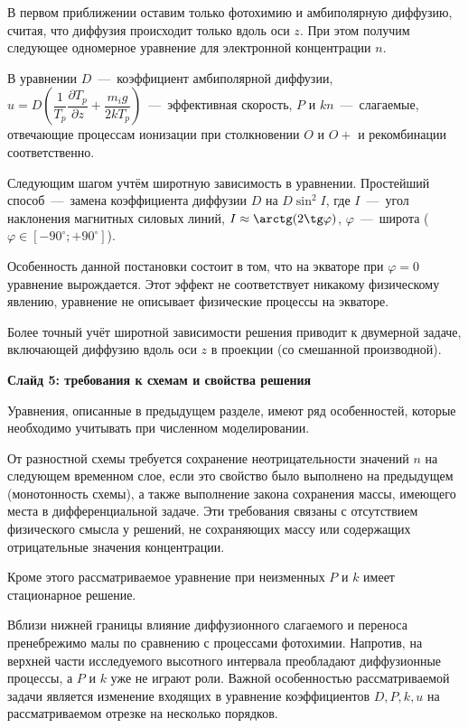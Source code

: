 \documentclass[2pt, a4paper, fleqn]{extarticle}
\begin{document}
В первом приближении оставим только фотохимию и амбиполярную диффузию, считая, что диффузия происходит только вдоль оси $z$. При этом получим следующее одномерное уравнение для электронной концентрации $n$.

В уравнении $D$~---~коэффициент амбиполярной диффузии, $u = D\left(\dfrac{1}{T_p}\dfrac{\partial T_p}{\partial z}+\dfrac{m_ig}{2kT_p}\right)$~---~эффективная скорость, $P$ и $kn$~---~слагаемые, отвечающие процессам ионизации при столкновении $O$ и $O+$ и рекомбинации соответственно.

Следующим шагом учтём широтную зависимость в уравнении. Простейший способ~---~замена коэффициента диффузии $D$ на $D\sin^2I$, где $I$~---~угол наклонения магнитных силовых линий, $I \approx \arctg(2\tg \varphi)$, $\varphi$~---~широта ($\varphi \in [-90^\circ; +90^\circ]$).

Особенность данной постановки состоит в том, что на экваторе при $\varphi=0$ уравнение вырождается. Этот эффект не соответствует никакому физическому явлению, уравнение не описывает физические процессы на экваторе.

Более точный учёт широтной зависимости решения приводит к двумерной задаче, включающей диффузию вдоль оси $z$ в проекции (со смешанной производной).

\medskip

{\bf Слайд 5: требования к схемам и свойства решения}

Уравнения, описанные в предыдущем разделе, имеют ряд особенностей, которые необходимо учитывать при численном моделировании.

От разностной схемы требуется сохранение неотрицательности значений $n$ на следующем временном слое, если это свойство было выполнено на предыдущем (монотонность схемы), а также выполнение закона сохранения массы, имеющего места в дифференциальной задаче. Эти требования связаны с отсутствием физического смысла у решений, не сохраняющих массу или содержащих отрицательные значения концентрации.

Кроме этого рассматриваемое уравнение при неизменных $P$ и $k$ имеет стационарное решение.

Вблизи нижней границы влияние диффузионного слагаемого и переноса пренебрежимо малы по сравнению с процессами фотохимии. Напротив, на верхней части исследуемого высотного интервала преобладают диффузионные процессы, а $P$ и $k$ уже не играют роли. Важной особенностью рассматриваемой задачи является изменение входящих в уравнение коэффициентов $D, P, k, u$ на рассматриваемом отрезке на несколько порядков. 
\end{document}
